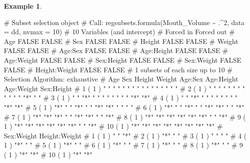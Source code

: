 \documentclass[
  a4paper,
]{article}
\newenvironment{Shaded}{\begin{snugshade}}{\end{snugshade}}
\newcommand{\NormalTok}[1]{#1}
\theoremstyle{definition}
\theoremstyle{definition}
\newtheorem{example}{Example}[section]
\theoremstyle{definition}
\theoremstyle{definition}
\theoremstyle{remark}
\begin{document}
\begin{example}
\begin{Shaded}
\begin{Highlighting}[]
\NormalTok{\# Subset selection object}
\NormalTok{\# Call: regsubsets.formula(Mouth\_Volume \textasciitilde{} .\^{}2, data = dd, nvmax = 10)}
\NormalTok{\# 10 Variables  (and intercept)}
\NormalTok{\#               Forced in Forced out}
\NormalTok{\# Age               FALSE      FALSE}
\NormalTok{\# Sex               FALSE      FALSE}
\NormalTok{\# Height            FALSE      FALSE}
\NormalTok{\# Weight            FALSE      FALSE}
\NormalTok{\# Age:Sex           FALSE      FALSE}
\NormalTok{\# Age:Height        FALSE      FALSE}
\NormalTok{\# Age:Weight        FALSE      FALSE}
\NormalTok{\# Sex:Height        FALSE      FALSE}
\NormalTok{\# Sex:Weight        FALSE      FALSE}
\NormalTok{\# Height:Weight     FALSE      FALSE}
\NormalTok{\# 1 subsets of each size up to 10}
\NormalTok{\# Selection Algorithm: exhaustive}
\NormalTok{\#           Age Sex Height Weight Age:Sex Age:Height Age:Weight Sex:Height}
\NormalTok{\# 1  ( 1 )  " " " " " "    " "    " "     " "        " "        " "       }
\NormalTok{\# 2  ( 1 )  " " " " " "    " "    " "     " "        "*"        " "       }
\NormalTok{\# 3  ( 1 )  " " "*" " "    " "    " "     " "        "*"        "*"       }
\NormalTok{\# 4  ( 1 )  " " "*" " "    " "    " "     " "        "*"        "*"       }
\NormalTok{\# 5  ( 1 )  "*" " " "*"    " "    "*"     "*"        " "        " "       }
\NormalTok{\# 6  ( 1 )  "*" " " "*"    " "    "*"     "*"        " "        "*"       }
\NormalTok{\# 7  ( 1 )  "*" "*" "*"    " "    "*"     "*"        " "        "*"       }
\NormalTok{\# 8  ( 1 )  "*" "*" "*"    "*"    "*"     "*"        " "        "*"       }
\NormalTok{\# 9  ( 1 )  "*" "*" "*"    "*"    "*"     "*"        " "        "*"       }
\NormalTok{\# 10  ( 1 ) "*" "*" "*"    "*"    "*"     "*"        "*"        "*"       }
\NormalTok{\#           Sex:Weight Height:Weight}
\NormalTok{\# 1  ( 1 )  " "        "*"          }
\NormalTok{\# 2  ( 1 )  "*"        " "          }
\NormalTok{\# 3  ( 1 )  " "        " "          }
\NormalTok{\# 4  ( 1 )  "*"        " "          }
\NormalTok{\# 5  ( 1 )  "*"        " "          }
\NormalTok{\# 6  ( 1 )  "*"        " "          }
\NormalTok{\# 7  ( 1 )  "*"        " "          }
\NormalTok{\# 8  ( 1 )  "*"        " "          }
\NormalTok{\# 9  ( 1 )  "*"        "*"          }
\NormalTok{\# 10  ( 1 ) "*"        "*"}
\end{Highlighting}
\end{Shaded}


\end{example}
\end{document}
